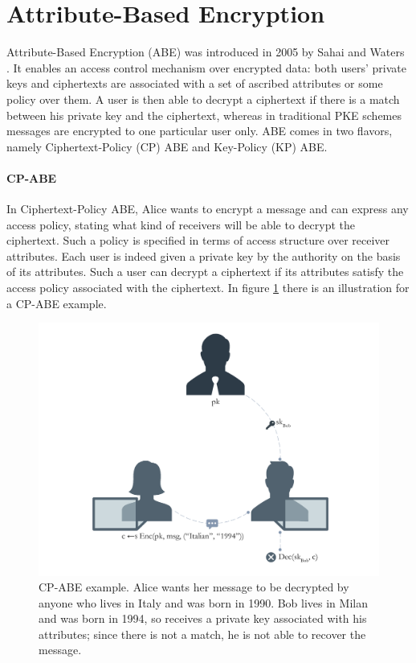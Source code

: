 \section{Attribute-Based Encryption}\label{sec:abe}

Attribute-Based Encryption (ABE) was introduced in 2005 by Sahai and Waters \cite{Sahai}.
It enables an access control mechanism over encrypted data: both users’ private keys and ciphertexts are associated with a set of ascribed attributes or some policy over them.
A user is then able to decrypt a ciphertext if there is a match between his private key and the ciphertext, whereas in traditional PKE schemes messages are encrypted to one particular user only.
\newline\newline
ABE comes in two flavors, namely Ciphertext-Policy (CP) ABE and Key-Policy (KP) ABE.

\paragraph*{CP-ABE}
In Ciphertext-Policy ABE, Alice wants to encrypt a message and can express any access policy, stating what kind of receivers will be able to decrypt the ciphertext.
Such a policy is specified in terms of access structure over receiver attributes.
Each user is indeed given a private key by the authority on the basis of its attributes.
Such a user can decrypt a ciphertext if its attributes satisfy the access policy associated with the ciphertext.
In figure \ref{fig:cp_abe_example} there is an illustration for a CP-ABE example.
\begin{figure}[ht]
    \centering
    \includegraphics[width=\linewidth]{images/cp_abe.png}
    \caption{CP-ABE example. Alice wants her message to be decrypted by anyone who lives in Italy and was born in 1990. Bob lives in Milan and was born in 1994, so receives a private key associated with his attributes; since there is not a match, he is not able to recover the message.}
    \label{fig:cp_abe_example}
\end{figure}

